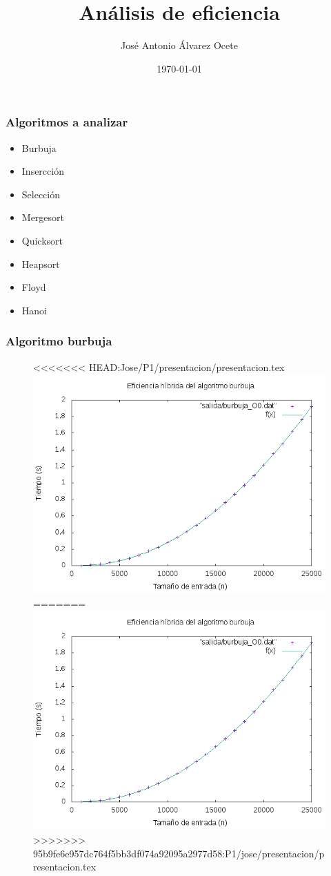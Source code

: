 \documentclass[spanish]{beamer}
\title{Análisis de eficiencia}
\date{\today}
\author{José Antonio Álvarez Ocete}
\begin{document}
\frame{\titlepage}

\begin{frame}\frametitle{Algoritmos a analizar}

  \begin{itemize}
  \item Burbuja
  \item Insercción
  \item Selección
  \item Mergesort
  \item Quicksort
  \item Heapsort
  \item Floyd 
  \item Hanoi
  \end{itemize}
  
\end{frame}

%
%

\begin{frame}\frametitle{Algoritmo burbuja}
  \begin{figure}[H]
    \centering   
<<<<<<< HEAD:Jose/P1/presentacion/presentacion.tex
        \includegraphics[clip,width=1\columnwidth]{../plots/burbuja_O0_fit.png}%
=======
        \includegraphics[clip,width=0.8\columnwidth]{../plots/burbuja_O0_fit.png}%
>>>>>>> 95b9fe6e957dc764f5bb3df074a92095a2977d58:P1/jose/presentacion/presentacion.tex
    \end{figure}
  \end{frame}
\end{document}
